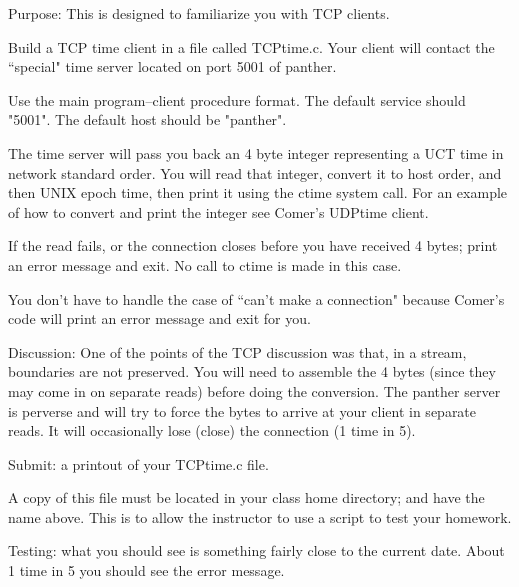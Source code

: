 

\parindent 0pt

Purpose: This is designed to familiarize you with TCP clients.

Build a TCP time client in a file called {\ltt{}TCPtime.c}.
Your client will contact the ``special" time server located
on port 5001 of panther.

Use the main program--client procedure format.
The default service should {\ltt{}"5001"}.
The default host should be {\ltt{}"panther"}.

The time server will pass you back an 4 byte integer representing a 
UCT time in network standard order.
You will read that integer, convert it to host order,
and then UNIX epoch time,
then print it using the {\ltt{}ctime} system call.
For an example of how to convert and print the integer
see Comer's {\ltt{}UDPtime} client.

If the read fails, or the connection closes before you have
received 4 bytes; print an error message and exit.
No call to {\ltt{}ctime} is made in this case.

You don't have to handle the case of ``can't make a connection"
because Comer's code will print an error message and exit for you.

Discussion:
One of the points of the TCP discussion was that, in a stream,
boundaries are not preserved.
You will need to assemble the 4 bytes (since they may come in on
separate reads)
before doing the conversion.
The {\ltt{}panther} server is perverse and will try to force
the bytes to arrive at your client in separate reads.
It will occasionally lose (close) the connection (1 time in 5).

Submit: a printout of your {\ltt{}TCPtime.c} file.

A copy of this file must be located in your class home directory;
and have the name above.
This is to allow the instructor to use a script to test your homework.

Testing: what you should see is something fairly close to
the current date.
About 1 time in 5 you should see the error message.

\bye
